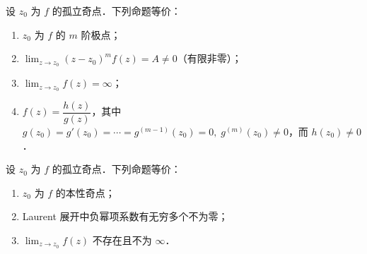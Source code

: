 \documentclass[12pt, a4paper, oneside, UTF8]{ctexbook}
\begin{document}
\begin{theorem}[极点的判别法]
设 $z_0$ 为 $f$ 的孤立奇点．下列命题等价：
\begin{enumerate}
    \item $z_0$ 为 $f$ 的 $m$ 阶极点；
    \item $\displaystyle\lim_{z\to z_0} (z-z_0)^m f(z) = A\neq 0$（有限非零）；
    \item $\displaystyle\lim_{z\to z_0} f(z) = \infty$；
    \item $f(z) = \dfrac{h(z)}{g(z)}$，其中$g(z_0)= g'(z_0) = \cdots = g^{(m-1)}(z_0) = 0,\;g^{(m)}(z_0)\neq 0$，而 $h(z_0) \neq 0$．
\end{enumerate}
\end{theorem}

\begin{theorem}[本性奇点的判别法]
设 $z_0$ 为 $f$ 的孤立奇点．下列命题等价：
\begin{enumerate}
    \item $z_0$ 为 $f$ 的本性奇点；
    \item Laurent 展开中负幂项系数有无穷多个不为零；
    \item $\displaystyle\lim_{z\to z_0} f(z)$ 不存在且不为 $\infty$．
\end{enumerate}
\end{theorem}
\end{document}
